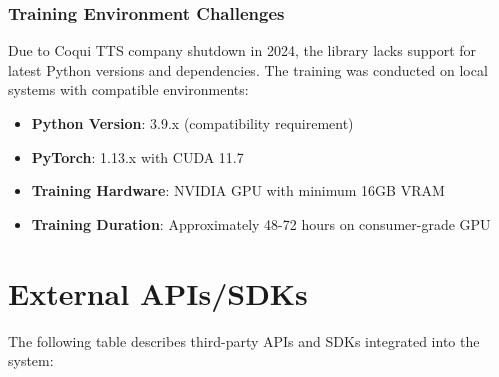 \subsubsection{Training Environment Challenges}

Due to Coqui TTS company shutdown in 2024, the library lacks support for latest Python versions and dependencies. The training was conducted on local systems with compatible environments:

\begin{itemize}
    \item \textbf{Python Version}: 3.9.x (compatibility requirement)
    \item \textbf{PyTorch}: 1.13.x with CUDA 11.7
    \item \textbf{Training Hardware}: NVIDIA GPU with minimum 16GB VRAM
    \item \textbf{Training Duration}: Approximately 48-72 hours on consumer-grade GPU
\end{itemize}


\section{External APIs/SDKs}

The following table describes third-party APIs and SDKs integrated into the system:

